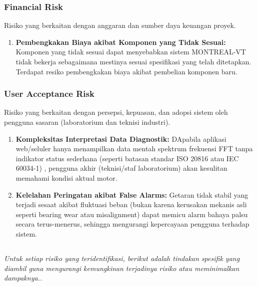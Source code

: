 \documentclass{elsinta}
\begin{document}
\subsubsection*{Financial Risk}
Risiko yang berkaitan dengan anggaran dan sumber daya keuangan proyek.
\begin{enumerate}
    \item \textbf{Pembengkakan Biaya akibat Komponen yang Tidak Sesuai:} Komponen yang tidak sesuai dapat menyebabkan sistem MONTREAL-VT tidak bekerja sebagaimana mestinya sesuai spesifikasi yang telah ditetapkan. Terdapat resiko pembengkakan biaya akibat pembelian komponen baru.
\end{enumerate}

\subsubsection*{User Acceptance Risk}
Risiko yang berkaitan dengan persepsi, kepuasan, dan adopsi sistem oleh pengguna sasaran (laboratorium dan teknisi industri). 
\begin{enumerate}
    \item \textbf{Kompleksitas Interpretasi Data Diagnostik:} DApabila aplikasi web/seluler hanya menampilkan data mentah spektrum frekuensi FFT tanpa indikator status sederhana (seperti batasan standar ISO 20816 atau IEC 60034-1) , pengguna akhir (teknisi/staf laboratorium) akan kesulitan memahami kondisi aktual motor. 
    \item \textbf{Kelelahan Peringatan akibat False Alarms:} Getaran tidak stabil yang terjadi sesaat akibat fluktuasi beban (bukan karena kerusakan mekanis asli seperti bearing wear atau misalignment) dapat memicu alarm bahaya palsu secara terus-menerus, sehingga mengurangi kepercayaan pengguna terhadap sistem.

\end{enumerate}

\subsection{\RiskMitigationTitle}
\textit{Untuk setiap risiko yang teridentifikasi, berikut adalah tindakan spesifik yang diambil guna mengurangi kemungkinan terjadinya risiko atau meminimalkan dampaknya..}
\end{document}
